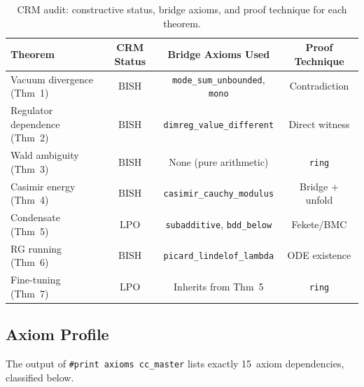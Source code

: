 \documentclass[11pt,a4paper]{article}
\theoremstyle{plain}
\theoremstyle{definition}
\newcommand{\LPO}{\ensuremath{\mathrm{LPO}}}
\newcommand{\BISH}{\ensuremath{\mathrm{BISH}}}
\begin{document}
\begin{table}[ht]
\centering
\begin{tabular}{@{}lccc@{}}
\toprule
\textbf{Theorem} & \textbf{CRM Status} & \textbf{Bridge Axioms Used} & \textbf{Proof Technique} \\
\midrule
Vacuum divergence (Thm~1) & $\BISH$ & \texttt{mode\_sum\_unbounded}, \texttt{mono} & Contradiction \\
Regulator dependence (Thm~2) & $\BISH$ & \texttt{dimreg\_value\_different} & Direct witness \\
Wald ambiguity (Thm~3) & $\BISH$ & None (pure arithmetic) & \texttt{ring} \\
Casimir energy (Thm~4) & $\BISH$ & \texttt{casimir\_cauchy\_modulus} & Bridge + unfold \\
Condensate (Thm~5) & $\LPO$ & \texttt{subadditive}, \texttt{bdd\_below} & Fekete/BMC \\
RG running (Thm~6) & $\BISH$ & \texttt{picard\_lindelof\_lambda} & ODE existence \\
Fine-tuning (Thm~7) & $\LPO$ & Inherits from Thm~5 & \texttt{ring} \\
\bottomrule
\end{tabular}
\caption{CRM audit: constructive status, bridge axioms, and proof technique for each theorem.}
\label{tab:audit}
\end{table}

\subsection{Axiom Profile}

The output of \texttt{\#print axioms cc\_master} lists exactly 15~axiom
dependencies, classified below.
\end{document}
